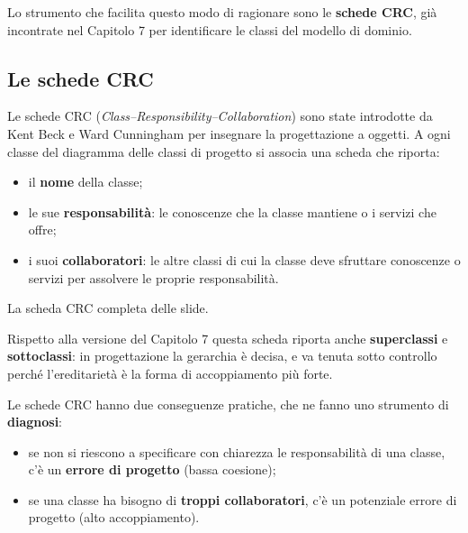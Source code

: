 Lo strumento che facilita questo modo di ragionare sono le \textbf{schede CRC}, già incontrate nel Capitolo 7 per
identificare le classi del modello di dominio.

\subsection{Le schede CRC}

Le schede CRC (\textit{Class--Responsibility--Collaboration}) sono state introdotte da Kent Beck e Ward Cunningham per
insegnare la progettazione a oggetti. A ogni classe del diagramma delle classi di progetto si associa una scheda che
riporta:
\begin{itemize}
  \item il \textbf{nome} della classe;
  \item le sue \textbf{responsabilità}: le conoscenze che la classe mantiene o i servizi che offre;
  \item i suoi \textbf{collaboratori}: le altre classi di cui la classe deve sfruttare conoscenze o servizi per assolvere
        le proprie responsabilità.
\end{itemize}

\noindent\begin{minipage}[c]{0.4\textwidth}
\centering
{}

{\scriptsize La scheda CRC completa delle slide.}
\end{minipage}\hfill
\begin{minipage}[c]{0.56\textwidth}
Rispetto alla versione del Capitolo 7 questa scheda riporta anche \textbf{superclassi} e \textbf{sottoclassi}: in
progettazione la gerarchia è decisa, e va tenuta sotto controllo perché l'ereditarietà è la forma di accoppiamento più forte.

Le schede CRC hanno due conseguenze pratiche, che ne fanno uno strumento di \textbf{diagnosi}:
\begin{itemize}
  \item se non si riescono a specificare con chiarezza le responsabilità di una classe, c'è un \textbf{errore di progetto}
        (bassa coesione);
  \item se una classe ha bisogno di \textbf{troppi collaboratori}, c'è un potenziale errore di progetto (alto
        accoppiamento).
\end{itemize}
\end{minipage}

